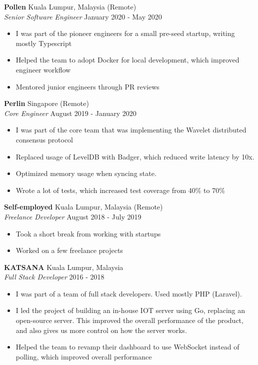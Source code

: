 \documentclass[a4paper]{article}
\begin{document}
\textbf{Pollen} \hfill Kuala Lumpur, Malaysia (Remote)\\
\textit{Senior Software Engineer} \hfill January 2020 - May 2020\\
\vspace{-1mm}
\begin{itemize} \itemsep 1pt
	\item I was part of the pioneer engineers for a small pre-seed startup, writing mostly Typescript
	\item Helped the team to adopt Docker for local development, which improved engineer workflow
	\item Mentored junior engineers through PR reviews
\end{itemize}

\textbf{Perlin} \hfill Singapore (Remote)\\
\textit{Core Engineer} \hfill August 2019 - January 2020\\
\vspace{-1mm}
\begin{itemize} \itemsep 1pt
	\item I was part of the core team that was implementing the Wavelet distributed consensus protocol
	\item Replaced usage of LevelDB with Badger, which reduced write latency by 10x.
	\item Optimized memory usage when syncing state.
	\item Wrote a lot of tests, which increased test coverage from 40\% to 70\%
\end{itemize}

\textbf{Self-employed} \hfill Kuala Lumpur, Malaysia (Remote)\\
\textit{Freelance Developer} \hfill August 2018 - July 2019\\
\vspace{-1mm}
\begin{itemize} \itemsep 1pt
	\item Took a short break from working with startups
	\item Worked on a few freelance projects
\end{itemize}

\pagebreak
\textbf{KATSANA} \hfill Kuala Lumpur, Malaysia\\
\textit{Full Stack Developer} \hfill 2016 - 2018\\
\vspace{-1mm}
\begin{itemize} \itemsep 1pt
	\item I was part of a team of full stack developers. Used mostly PHP (Laravel).
	\item I led the project of building an in-house IOT server using Go, replacing an open-source server. This improved the overall performance of the product, and also gives us more control on how the server works.
	\item Helped the team to revamp their dashboard to use WebSocket instead of polling, which improved overall performance
\end{itemize}
\end{document}
